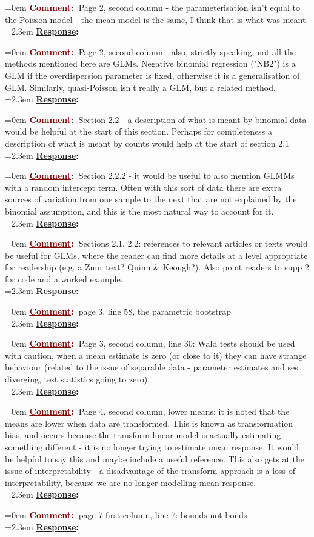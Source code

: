 \documentclass[12pt]{article}
\newcommand{\comment}[0]{\vspace{1em} \noindent \hangindent=0em \textbf{\textcolor{Maroon}{\uline{Comment}:~}}}
\newcommand{\response}[0]{\\\vspace{0.1em} \hangindent=2.3em \textbf{\textcolor{NavyBlue}{\uline{Response}:~}}}
\begin{document}
\comment Page 2, second column - the parameterisation isn't equal to the Poisson model - the mean model is the same, I think that is what was meant.
\response 

\comment Page 2, second column - also, strictly speaking, not all the methods mentioned here are GLMs.  Negative binomial regression ("NB2") is a GLM if the overdispersion parameter is fixed, otherwise it is a generalisation of GLM.  Similarly, quasi-Poisson isn't really a GLM, but a related method.
\response

\comment Section 2.2 - a description of what is meant by binomial data would be helpful at the start of this section.  Perhaps for completeness a description of what is meant by counts would help at the start of section 2.1
\response

\comment Section 2.2.2 - it would be useful to also mention GLMMs with a random intercept term.  Often with this sort of data there are extra sources of variation from one sample to the next that are not explained by the binomial assumption, and this is the most natural way to account for it.
\response

\comment Sections 2.1, 2.2: references to relevant articles or texts would be useful for GLMs, where the reader can find more details at a level appropriate for readership (e.g. a Zuur text?  Quinn \& Keough?).  Also point readers to supp 2 for code and a worked example.
\response

\comment page 3, line 58, the parametric bootstrap
\response

\comment Page 3, second column, line 30: Wald tests should be used with caution, when a mean estimate is zero (or close to it) they can have strange behaviour (related to the issue of separable data - parameter estimates and ses diverging, test statistics going to zero).
\response

\comment Page 4, second column, lower means: it is noted that the means are lower when data are transformed.  This is known as transformation bias, and occurs because the transform linear model is actually estimating something different - it is no longer trying to estimate mean response.  It would be helpful to say this and maybe include a useful reference.  This also gets at the issue of interpretability - a disadvantage of the transform approach is a loss of interpretability, because we are no longer modelling mean response.
\response

\comment page 7 first column, line 7: bounds not bonds
\response
\end{document}
